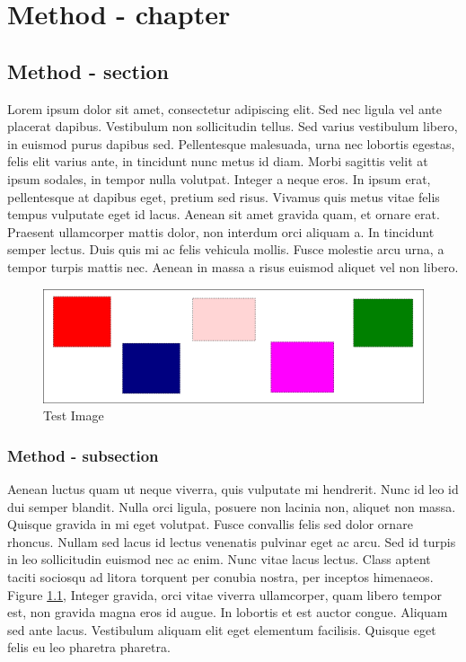 \chapter{Method - chapter}
\section{Method - section}
Lorem ipsum dolor sit amet, consectetur adipiscing elit. Sed nec ligula vel
ante placerat dapibus. Vestibulum non sollicitudin tellus. Sed varius
vestibulum libero, in euismod purus dapibus sed. Pellentesque malesuada, urna
nec lobortis egestas, felis elit varius ante, in tincidunt nunc metus id diam.
Morbi sagittis velit at ipsum sodales, in tempor nulla volutpat. Integer a
neque eros. In ipsum erat, pellentesque at dapibus eget, pretium sed risus.
Vivamus quis metus vitae felis tempus vulputate eget id lacus. Aenean sit amet
gravida quam, et ornare erat. Praesent ullamcorper mattis dolor, non interdum
orci aliquam a. In tincidunt semper lectus. Duis quis mi ac felis vehicula
mollis. Fusce molestie arcu urna, a tempor turpis mattis nec. Aenean in massa a
risus euismod aliquet vel non libero.

\begin{figure}[h]
    \centering
    \includegraphics[width=\textwidth]{figures/test_image}
    \caption{Test Image}
    \label{fig:test_image}
\end{figure}

\subsection{Method - subsection}
Aenean luctus quam ut neque viverra, quis vulputate mi hendrerit. Nunc id leo
id dui semper blandit. Nulla orci ligula, posuere non lacinia non, aliquet non
massa. Quisque gravida in mi eget volutpat. Fusce convallis felis sed dolor
ornare rhoncus. Nullam sed lacus id lectus venenatis pulvinar eget ac arcu. Sed
id turpis in leo sollicitudin euismod nec ac enim. Nunc vitae lacus lectus.
Class aptent taciti sociosqu ad litora torquent per conubia nostra, per
inceptos himenaeos. Figure \ref{fig:test_image}, Integer gravida, orci vitae
viverra ullamcorper, quam libero tempor est, non gravida magna eros id augue.
In lobortis et est auctor congue. Aliquam sed ante lacus. Vestibulum aliquam
elit eget elementum facilisis. Quisque eget felis eu leo pharetra pharetra.

